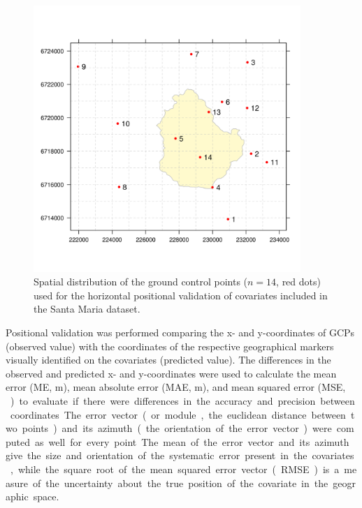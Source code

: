 \begin{figure}[!ht]
\centering
\includegraphics[width = 0.90\textwidth]{fig/chap05-field-gcps}
\caption[Ground control points used for the positional validation of the covariates.]{Spatial distribution of 
the ground control points ($n = 14$, red dots) used for the horizontal positional validation of covariates 
included in the Santa Maria dataset.}
\label{fig:chap05-field-gcps}
\end{figure}

Positional validation was performed comparing the x- and y-coordinates of GCPs (observed value) with the 
coordinates of the respective geographical markers visually identified on the covariates (predicted value). 
The differences in the observed and predicted x- and y-coordinates were used to calculate the mean error (ME, 
\si{\m}), mean absolute error (MAE, \si{\m}), and mean squared error (MSE, \si{\m\square}) to evaluate if 
there were differences in the accuracy and precision between coordinates. The error vector (or module, the 
euclidean distance between two points) and its azimuth (the orientation of the error vector) were computed as 
well for every point. The mean of the error vector and its azimuth give the size and orientation of the 
systematic error present in the covariates, while the square root of the mean squared error vector (RMSE) is a 
measure of the uncertainty about the true position of the covariate in the geographic space.

